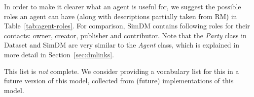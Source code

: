 


In order to make it clearer what an agent is useful for, we suggest the
possible roles an agent can have (along with descriptions partially taken from RM)
in Table~\ref{tab:agent-roles}.
For comparison, SimDM contains following roles for their contacts:
owner, creator, publisher and contributor. Note that the \emph{Party} class in Dataset and SimDM are very similar to the \emph{Agent} class, which is explained in more detail in Section~\ref{sec:dmlinks}.


This list is \emph{not} complete. We consider providing a vocabulary list for this 
in a future version of this model, collected from (future) implementations of this model.




